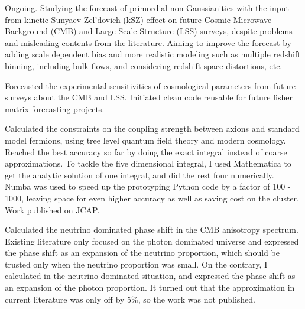 \documentclass[letter,12pt]{article}
\begin{document}
\begin{zitemize}
\item Ongoing. Studying the forecast of primordial non-Gaussianities with the input from kinetic Sunyaev Zel’dovich (kSZ) effect on future Cosmic Microwave Background (CMB) and Large Scale Structure (LSS) surveys, despite problems and misleading contents from the literature. Aiming to improve the forecast by adding scale dependent bias and more realistic modeling such as multiple redshift binning, including bulk flows, and considering redshift space distortions, etc.
\item Forecasted the experimental sensitivities of cosmological parameters from future surveys about the CMB and LSS. Initiated clean code reusable for future fisher matrix forecasting projects. 
\item Calculated the constraints on the coupling strength between axions and standard model fermions, using tree level quantum field theory and modern cosmology. Reached the best accuracy so far by doing the exact integral instead of coarse approximations. To tackle the five dimensional integral, I used Mathematica to get the analytic solution of one integral, and did the rest four numerically. Numba was used to speed up the prototyping Python code by a factor of 100 - 1000, leaving space for even higher accuracy as well as saving cost on the cluster. Work published on JCAP.
\item Calculated the neutrino dominated phase shift in the CMB anisotropy spectrum. Existing literature only focused on the photon dominated universe and expressed the phase shift as an expansion of the neutrino proportion, which should be trusted only when the neutrino proportion was small. On the contrary, I calculated in the neutrino dominated situation, and expressed the phase shift as an expansion of the photon proportion. It turned out that the approximation in current literature was only off by 5\%, so the work was not published.
\end{zitemize}
\end{document}
